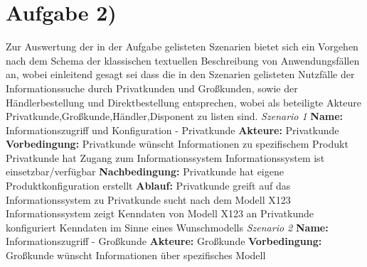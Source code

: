 \documentclass{swp1}
\begin{document}
\section*{Aufgabe 2)}

Zur Auswertung der in der Aufgabe gelisteten Szenarien bietet sich ein Vorgehen nach dem Schema der klassischen textuellen Beschreibung von Anwendungsfällen an, wobei einleitend gesagt sei dass die in den Szenarien gelisteten Nutzfälle der Informationssuche durch Privatkunden und Großkunden, sowie der Händlerbestellung und Direktbestellung entsprechen, wobei als beteiligte Akteure Privatkunde,Großkunde,Händler,Disponent zu listen sind.\newline
\newline
\emph{Szenario 1}\newline
\textbf{Name:}\newline
Informationszugriff und Konfiguration - Privatkunde\newline
\textbf{Akteure:}\newline
Privatkunde\newline
\textbf{Vorbedingung:}\newline
Privatkunde wünscht Informationen zu spezifischem Produkt\newline
Privatkunde hat Zugang zum Informationssystem\newline
Informationssystem ist einsetzbar/verfügbar\newline
\textbf{Nachbedingung:}\newline
Privatkunde hat eigene Produktkonfiguration erstellt\newline
\textbf{Ablauf:}\newline
Privatkunde greift auf das Informationssystem zu\newline
Privatkunde sucht nach dem Modell X123\newline
Informationssystem zeigt Kenndaten von Modell X123 an\newline
Privatkunde konfiguriert Kenndaten im Sinne eines Wunschmodells\newline
\newline
\emph{Szenario 2}\newline
\textbf{Name:}\newline
Informationszugriff - Großkunde\newline
\textbf{Akteure:}\newline
Großkunde\newline
\textbf{Vorbedingung:}\newline
Großkunde wünscht Informationen über spezifisches Modell\newline
\end{document}
